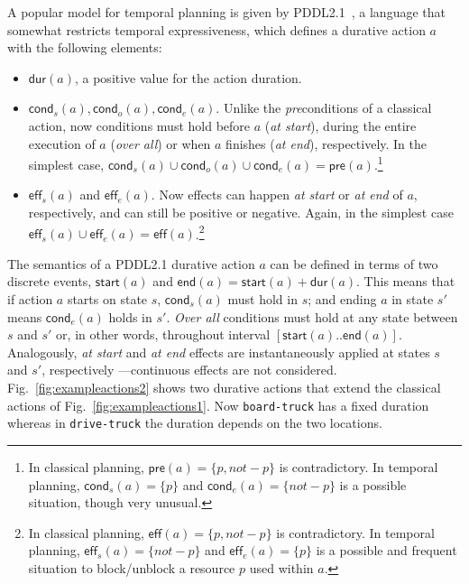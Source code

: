 \documentclass[10pt,journal,compsoc]{IEEEtran}
\newcommand{\pre}{\mathsf{pre}}    %
\newcommand{\eff}{\mathsf{eff}}    %
\newcommand{\cond}{\mathsf{cond}}  %
\newcommand{\dur}{\mathsf{dur}}    %
\newcommand{\start}{\mathsf{start}}%
\newcommand{\en}{\mathsf{end}}     %
\begin{document}
A popular model for temporal planning is given by PDDL2.1~\cite{fox2003pddl2}, a language that somewhat restricts temporal expressiveness, which defines a durative action $a$ with the following elements:

\begin{itemize}
	
	\item $\dur(a)$, a positive value for the action duration.
	
	\item $\cond_s(a), \cond_o(a), \cond_e(a)$. Unlike the \emph{pre}conditions of a classical action, now conditions must hold before $a$ ({\em at start}), during the entire execution of $a$ ({\em over all}) or when $a$ finishes ({\em at end}), respectively. In the simplest case, $\cond_s(a) \cup \cond_o(a) \cup \cond_e(a) = \pre(a).$\footnote{In classical planning, $\pre(a)=\{p,not-p\}$ is contradictory. In temporal planning, $\cond_s(a)=\{p\}$ and $\cond_e(a)=\{not-p\}$ is a possible situation, though very unusual.}
	
	\item $\eff_s(a)$ and $\eff_e(a)$. Now effects can happen {\em at start} or {\em at end} of $a$, respectively, and can still be positive or negative. Again, in the simplest case $\eff_s(a) \cup \eff_e(a) = \eff(a)$.\footnote{In classical planning, $\eff(a)=\{p,not-p\}$ is contradictory. In temporal planning, $\eff_s(a)=\{not-p\}$ and $\eff_e(a)=\{p\}$ is a possible and frequent situation to block/unblock a resource $p$ used within $a$.}
	
\end{itemize}



The semantics of a PDDL2.1 durative action $a$ can be defined in terms of two discrete events, $\start(a)$ and $\en(a)=\start(a)+\dur(a)$. This means that if action $a$ starts on state $s$, $\cond_s(a)$ must hold in $s$; and ending $a$ in state $s'$ means $\cond_e(a)$ holds in $s'$. {\em Over all} conditions must hold at any state between $s$ and $s'$ or, in other words, throughout interval $[\start(a)..\en(a)]$.
Analogously, {\em at start} and {\em at end} effects are instantaneously applied at states $s$ and $s'$, respectively ---continuous effects are not considered.
Fig.~\ref{fig:exampleactions2} shows two durative actions that extend the classical actions of Fig.~\ref{fig:exampleactions1}. Now \texttt{board-truck} has a fixed duration whereas in \texttt{drive-truck} the duration depends on the two locations.
\end{document}
